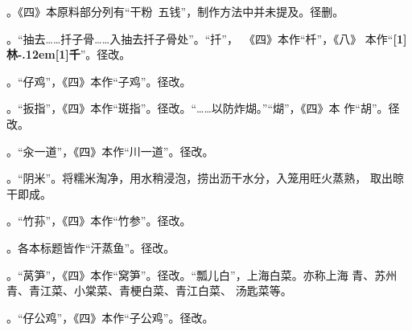 \begin{list}{}
。《四》本原料部分列有“干粉~五钱”，制作方法中并未提及。径删。

。“抽去……扦子骨……入抽去扦子骨处”。“扦”，~《四》本作“杄”，《八》
本作“{\bfseries\scalebox{.65}[1]{林}\kern-.12em\scalebox{.55}[1]{千}}”。径改。

。“仔鸡”，《四》本作“子鸡”。径改。

。“扳指”，《四》本作“斑指”。径改。“……以防炸煳。”“煳”，《四》本
作“胡”。径改。

。“汆一道”，《四》本作“川一道”。径改。

。“阴米”。将糯米淘净，用水稍浸泡，捞出沥干水分，入笼用旺火蒸熟，
取出晾干即成。

。“竹荪”，《四》本作“竹参”。径改。

。各本标题皆作“汗蒸鱼”。径改。

。“莴笋”，《四》本作“窝笋”。径改。“瓢儿白”，上海白菜。亦称上海
青、苏州青、青江菜、小棠菜、青梗白菜、青江白菜、 汤匙菜等。

。“仔公鸡”，《四》本作“子公鸡”。径改。

\end{list}
\endgroup%

